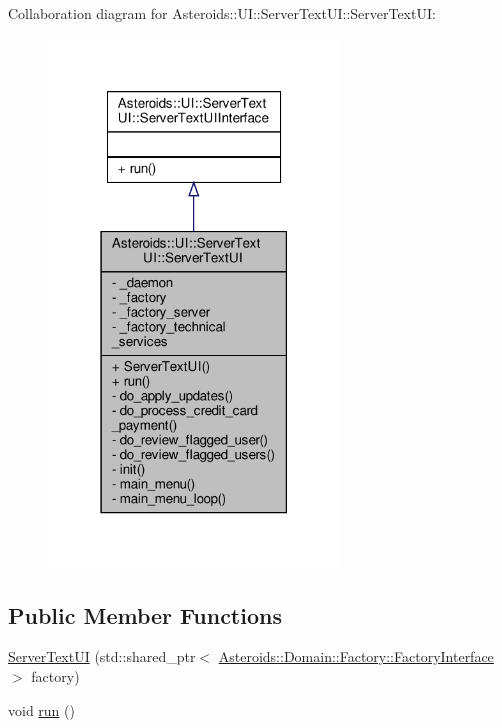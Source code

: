 Collaboration diagram for Asteroids\+:\+:UI\+:\+:Server\+Text\+UI\+:\+:Server\+Text\+UI\+:\nopagebreak
\begin{figure}[H]
\begin{center}
\leavevmode
\includegraphics[width=219pt]{classAsteroids_1_1UI_1_1ServerTextUI_1_1ServerTextUI__coll__graph}
\end{center}
\end{figure}
\subsection*{Public Member Functions}
\begin{DoxyCompactItemize}
\item 
\hyperlink{classAsteroids_1_1UI_1_1ServerTextUI_1_1ServerTextUI_aa66ce6a8f5a8293e564ba7fe5848eee6}{Server\+Text\+UI} (std\+::shared\+\_\+ptr$<$ \hyperlink{classAsteroids_1_1Domain_1_1Factory_1_1FactoryInterface}{Asteroids\+::\+Domain\+::\+Factory\+::\+Factory\+Interface} $>$ factory)
\item 
void \hyperlink{classAsteroids_1_1UI_1_1ServerTextUI_1_1ServerTextUI_a92fb489434b5bd2a9e91f5d77c9832ac}{run} ()
\end{DoxyCompactItemize}
